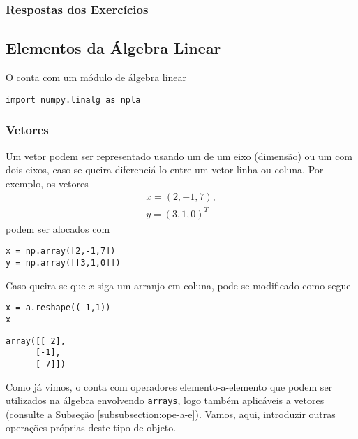 \ifisbook 
\subsubsection*{Respostas dos Exercícios}
\shipoutAnswer
\fi


\subsection{Elementos da Álgebra Linear}

O {\PYTHONnumpy} conta com um módulo de álgebra linear

\begin{lstlisting}
import numpy.linalg as npla
\end{lstlisting}

\subsubsection{Vetores}

Um vetor podem ser representado usando um {\PYTHONnumpyDOTarray} de um eixo (dimensão) ou um com dois eixos, caso se queira diferenciá-lo entre um vetor linha ou coluna. Por exemplo, os vetores
\begin{gather}
  x = (2, -1, 7),\\
  y = (3, 1, 0)^T
\end{gather}
podem ser alocados com

\begin{lstlisting}
x = np.array([2,-1,7])
y = np.array([[3,1,0]])
\end{lstlisting}

Caso queira-se que $x$ siga um arranjo em coluna, pode-se modificado como segue

\begin{lstlisting}
x = a.reshape((-1,1))
x
\end{lstlisting}

\begin{verbatim}
array([[ 2],
      [-1],
      [ 7]])
\end{verbatim}

Como já vimos, o {\numpy} conta com operadores elemento-a-elemento que podem ser utilizados na álgebra envolvendo \texttt{arrays}, logo também aplicáveis a vetores (consulte a Subseção \ref{subsubsection:ope-a-e}). Vamos, aqui, introduzir outras operações próprias deste tipo de objeto.

